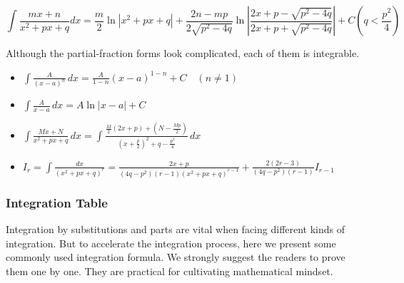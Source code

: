 \[
\int \frac{mx+n}{x^2 + px + q} dx = \frac{m}{2} \ln |x^2 + px + q| + \frac{2n-mp}{2\sqrt{p^2 - 4q}} \ln \left| \frac{2x + p - \sqrt{p^2 - 4q}}{2x + p + \sqrt{p^2 - 4q}} \right| + C (q < \frac{p^2}{4})
\]

Although the partial-fraction forms look complicated, each of them is integrable.

\begin{itemize}
    \item $\displaystyle\int \frac{A}{(x-a)^n}\,dx = \frac{A}{1-n}(x-a)^{1-n}+C \quad (n\neq 1)$
    \item $\displaystyle\int \frac{A}{x-a}\,dx = A\ln|x-a|+C$
    \item $\displaystyle\int \frac{Mx+N}{x^2+px+q}\,dx = \int \frac{\frac{M}{2}(2x+p) + \left(N-\frac{Mp}{2}\right)}{\left(x+\frac{p}{2}\right)^2 + q - \frac{p^2}{4}}\,dx$
    \item $\displaystyle I_r = \int \frac{dx}{(x^2+px+q)^r} = \frac{2x+p}{(4q-p^2)(r-1)(x^2+px+q)^{r-1}} + \frac{2(2r-3)}{(4q-p^2)(r-1)}I_{r-1}$
\end{itemize}



\subsubsection{Integration Table}

Integration by substitutions and parts are vital when facing different kinds of integration. But to accelerate the integration process, here we present some commonly used integration formula. We strongly suggest the readers to prove them one by one. They are practical for cultivating mathematical mindset.


